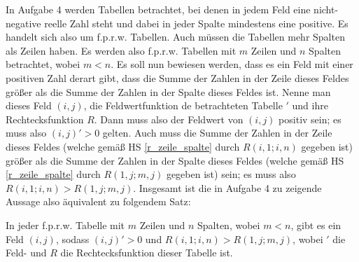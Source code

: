 In Aufgabe 4 werden Tabellen betrachtet, bei denen in jedem Feld eine nicht-negative reelle Zahl steht und dabei in 
jeder Spalte mindestens eine positive. Es handelt sich also um f.p.r.w. Tabellen. Auch müssen die Tabellen mehr 
Spalten als Zeilen haben. Es werden also f.p.r.w. Tabellen mit $m$ Zeilen und $n$ Spalten betrachtet, wobei $m<n$. 
Es soll nun bewiesen werden, dass es ein Feld mit einer positiven Zahl derart gibt, dass die Summe der Zahlen in der 
Zeile dieses Feldes größer als die Summe der Zahlen in der Spalte dieses Feldes ist. Nenne man dieses Feld $(i, j)$, 
die Feldwertfunktion de betrachteten Tabelle $'$ und ihre Rechtecksfunktion $R$. Dann muss also der Feldwert von $(i, j)$ 
positiv sein; es muss also $(i, j)'>0$ gelten. Auch muss die Summe der Zahlen in der Zeile dieses Feldes (welche 
gemäß HS \ref{r_zeile_spalte} durch $R(i, 1; i, n)$ gegeben ist) größer als die Summe der Zahlen in der Spalte 
dieses Feldes (welche gemäß HS \ref{r_zeile_spalte} durch $R(1, j; m, j)$ gegeben ist) sein; es muss also 
$R(i, 1; i, n) > R(1, j; m, j)$. Insgesamt ist die in Aufgabe 4 zu zeigende Aussage also äquivalent zu folgendem 
Satz:

\begin{thm}\label{haupt4}
    In jeder f.p.r.w. Tabelle mit $m$ Zeilen und $n$ Spalten, wobei $m<n$, gibt es ein Feld $(i, j)$, sodass 
    $(i, j)'>0$ und $R(i, 1; i, n) > R(1, j; m, j)$, wobei $'$ die Feld- und $R$ die Rechtecksfunktion dieser 
    Tabelle ist.
\end{thm}

